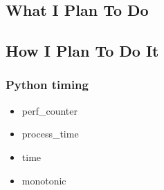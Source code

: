\subsection{What I Plan To Do}

\subsection{How I Plan To Do It}

\subsubsection{Python timing}

\begin{itemize}
    \item perf\_counter
    \item process\_time
    \item time
    \item monotonic
\end{itemize}
